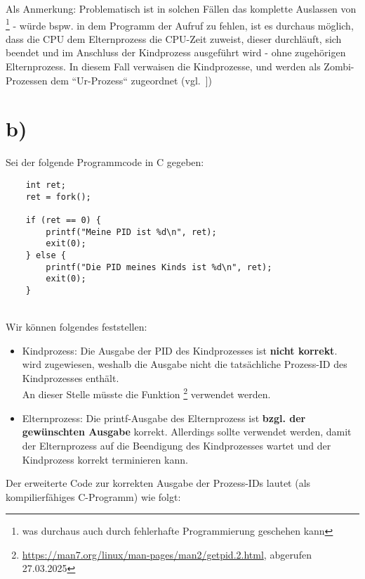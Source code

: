 \begin{itemize}
    Als Anmerkung: Problematisch ist in solchen Fällen das komplette Auslassen von \footnote{was durchaus auch durch fehlerhafte Programmierung geschehen kann} - würde bspw. in dem Programm der Aufruf zu  fehlen, ist es durchaus möglich, dass die CPU dem Elternprozess die CPU-Zeit zuweist, dieser durchläuft, sich beendet und im Anschluss der Kindprozess ausgeführt wird - ohne zugehörigen Elternprozess. In diesem Fall verwaisen die Kindprozesse, und werden als Zombi-Prozessen dem ``Ur-Prozess`` zugeordnet (vgl.~\cite[94 f.]{Man20e}])
\end{itemize}


\section{b)}

Sei der folgende Programmcode in C gegeben:

\begin{verbatim}
    int ret;
    ret = fork();

    if (ret == 0) {
        printf("Meine PID ist %d\n", ret);
        exit(0);
    } else {
        printf("Die PID meines Kinds ist %d\n", ret);
        exit(0);
    }
\end{verbatim}\\

\noindent
Wir können folgendes feststellen:

\begin{itemize}
    \itemsep0.5em
    \item {} Kindprozess: Die Ausgabe der PID des Kindprozesses ist \textbf{nicht korrekt}.
     wird  zugewiesen, weshalb die Ausgabe nicht die tatsächliche Prozess-ID des Kindprozesses enthält.\\
    An dieser Stelle müsste die Funktion \footnote{
\url{https://man7.org/linux/man-pages/man2/getpid.2.html}, abgerufen 27.03.2025
    } verwendet werden.
    \item {} Elternprozess: Die printf-Ausgabe des Elternprozess ist \textbf{bzgl. der gewünschten Ausgabe} korrekt.
    Allerdings sollte  verwendet werden, damit der Elternprozess auf die Beendigung des Kindprozesses wartet und der Kindprozess korrekt terminieren kann.
\end{itemize}

\noindent
Der erweiterte Code zur korrekten Ausgabe der Prozess-IDs lautet (als kompilierfähiges C-Programm) wie folgt:

